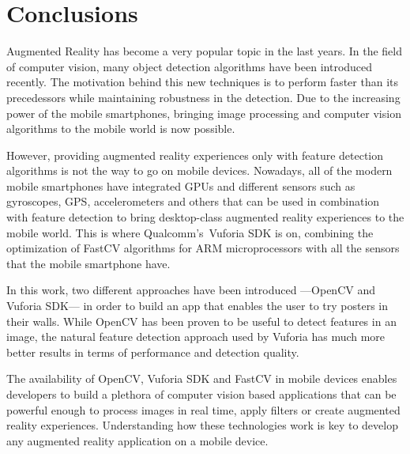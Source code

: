 \chapter{Conclusions}
Augmented Reality has become a very popular topic in the last years. In the field of
computer vision, many object detection algorithms have been introduced recently. The
motivation behind this new techniques is to perform faster than its precedessors
while maintaining robustness in the detection. Due to the increasing power of the
mobile smartphones, bringing image processing and computer vision algorithms to the
mobile world is now possible.

However, providing augmented reality experiences only with feature detection
algorithms is not the way to go on mobile devices. Nowadays, all of the modern
mobile smartphones have integrated GPUs and different sensors such as gyroscopes,
GPS, accelerometers and others that can be used in combination with feature
detection to bring desktop-class augmented reality experiences to the mobile world. 
This is where Qualcomm's\textregistered~Vuforia SDK is on, combining the optimization of
FastCV algorithms for ARM microprocessors with all the sensors that the mobile
smartphone have. 

In this work, two different approaches have been introduced ---OpenCV and
Vuforia SDK--- in order to build an app that enables the user to try posters in
their walls. While OpenCV has been proven to be useful to detect features in an
image, the natural feature detection approach used by Vuforia has much more
better results in terms of performance and detection quality. 

The availability of OpenCV, Vuforia SDK and FastCV in mobile devices enables
developers to build a plethora of computer vision based applications that can be
powerful enough to process images in real time, apply filters or create augmented
reality experiences. Understanding how these technologies work is key to develop any
augmented reality application on a mobile device.


